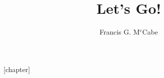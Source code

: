 \documentclass[fleqn,10pt,openright]{book}
\title{\Huge Let's Go!}
\author{Francis G. M$^\mbox{c}$Cabe}
\begin{document}
[chapter]

\newcommand{\go}{\q{Go!}\xspace}
\newcommand{\april}{{\tt April}\xspace}
\newcommand{\prolog}{\q{Prolog}\xspace}
\newcommand{\gcl}{\go Content Language\xspace}
\newcommand{\LO}{\q{L\&O}\xspace}
\newcommand{\new}{{\tt \char'044}\xspace}
\newcommand{\union}{{\tt \bsl/}\xspace}
\newcommand{\intersection}{{\tt /\bsl}\xspace}
\newcommand{\difference}{{\tt \bsl}\xspace}
\newcommand{\typearrow}{{\mbox{\tt <\tilda}}\xspace}
\newcommand{\tcast}{{\mbox{\tt \uphat}}\xspace}
\newcommand{\lblcast}{{\mbox{\tt \char`^\char`^}}\xspace}
\newcommand{\funarrow}{{\mbox{\tt =>}}\xspace}
\newcommand{\classarrow}{{\mbox{\tt <=}\xspace}}
\newcommand{\conarrow}{{\mbox{\tt @=}\xspace}}
\newcommand{\sconarrow}{{\mbox{\tt @>}\xspace}}
\newcommand{\classtype}{{\mbox{\tt <=}\xspace}}
\newcommand{\actsynopsis}[1]{{\tt #1*}\par\vskip1ex\noindent}
\newcommand{\libsynopsis}[1]{{\tt include "sys:go/#1".}\vskip1ex\noindent}
\newcommand{\safegoal}[2]{\ensuremath{\emph{#1}~\tinfers{}\/\mbox{\emph{safe$_P$($#2$)}}}}
\newcommand{\safeact}[2]{\ensuremath{\emph{#1}~\tinfers{}\/\mbox{\emph{safe$_A$($#2$)}}}}
\newcommand{\grammprd}[3]{\ensuremath{\emph{#1}~\tinfers{} {\emph{safe$_G$($#2$)}}\leadsto#3}}
\newcommand{\safegrammar}[3]{\ensuremath{\emph{#1}~\tinfers{}\mbox{\emph{safe$_G$($#2$,$#3$)}}}}
\newcommand{\extends}[4]{\ensuremath{\emph{#1}~\tinfers{}\/\mbox{\emph{extends\sub{\theta}}(#2)=[#3,..#4]}}}
\newcommand{\typeblw}[3]{\ensuremath{\emph{#1}~\tinfers{}#2\preceq #3}}
\end{document}
